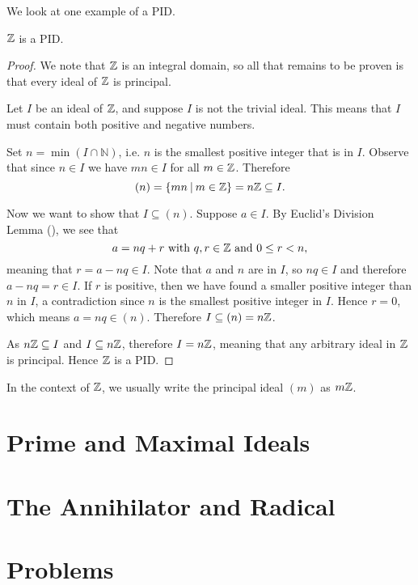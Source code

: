 We look at one example of a PID.
\begin{proposition}
    $\mathbb{Z}$ is a PID.
\end{proposition}
\begin{proof}
    We note that $\mathbb{Z}$ is an integral domain, so all that remains to be proven is that every ideal of $\mathbb{Z}$ is principal.

    Let $I$ be an ideal of $\mathbb{Z}$, and suppose $I$ is not the trivial ideal. This means that $I$ must contain both positive and negative numbers.
    
    Set $n = \min(I \cap \mathbb{N})$, i.e. $n$ is the smallest positive integer that is in $I$. Observe that since $n \in I$ we have $mn \in I$ for all $m \in \mathbb{Z}$. Therefore
    \[
        (n) = \{mn \vert m \in \Z\} = n\Z \subseteq I.
    \]

    Now we want to show that $I \subseteq (n)$. Suppose $a \in I$. By Euclid's Division Lemma (), we see that
    \[
        a = nq + r \text{ with } q,r\in\mathbb{Z} \text{ and } 0 \leq r < n,
    \]
    meaning that $r = a - nq \in I$. Note that $a$ and $n$ are in $I$, so $nq \in I$ and therefore $a - nq = r \in I$. If $r$ is positive, then we have found a smaller positive integer than $n$ in $I$, a contradiction since $n$ is the smallest positive integer in $I$. Hence $r = 0$, which means $a = nq \in (n)$. Therefore $I \subseteq (n) = n\mathbb{Z}$.

    As $n\mathbb{Z} \subseteq I$ and $I \subseteq n\mathbb{Z}$, therefore $I = n\mathbb{Z}$, meaning that any arbitrary ideal in $\mathbb{Z}$ is principal. Hence $\mathbb{Z}$ is a PID.
\end{proof}
\begin{remark}
    In the context of $\mathbb{Z}$, we usually write the principal ideal $(m)$ as $m\mathbb{Z}$.
\end{remark}

\section{Prime and Maximal Ideals}
\section{The Annihilator and Radical}
\newpage
\section{Problems}

\appendix
